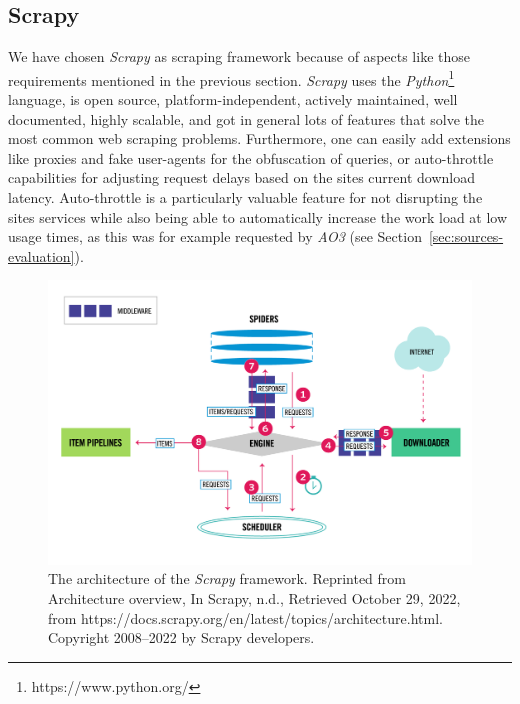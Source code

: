 \subsection{Scrapy}\label{subsec:scrapy}

We have chosen \emph{Scrapy} as scraping framework because of aspects like those requirements mentioned in the previous section.
\emph{Scrapy} uses the \emph{Python}\footnote{https://www.python.org/} language, is open source, platform-independent, actively maintained, well documented, highly scalable, and got in general lots of features that solve the most common web scraping problems.
Furthermore, one can easily add extensions like proxies and fake user-agents for the obfuscation of queries, or auto-throttle capabilities for adjusting request delays based on the sites current download latency.
Auto-throttle is a particularly valuable feature for not disrupting the sites services while also being able to automatically increase the work load at low usage times, as this was for example requested by \emph{AO3} (see Section~\ref{sec:sources-evaluation}).

\begin{figure}[htp]
    \centering
    \includegraphics[width=\textwidth]{figures/scrapy_architecture}
    \caption[The architecture of the \emph{Scrapy} framework.]{The architecture of the \emph{Scrapy} framework.
    Reprinted from Architecture overview,
    In Scrapy, n.d., Retrieved October 29, 2022, from https://docs.scrapy.org/en/latest/topics/architecture.html.
    Copyright 2008–2022 by Scrapy developers.}
    \label{fig:scrapy-architecture}
\end{figure}


